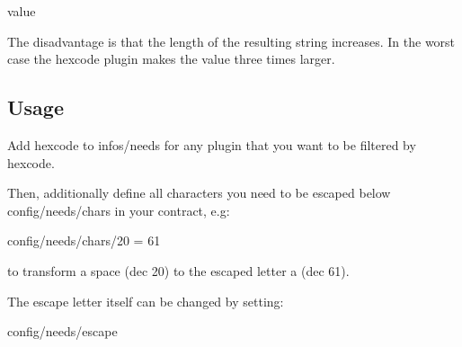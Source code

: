 \begin{DoxyCode}
value%
\end{DoxyCode}


The disadvantage is that the length of the resulting string increases. In the worst case the hexcode plugin makes the value three times larger.

\subsection*{Usage}

Add {\ttfamily hexcode} to {\ttfamily infos/needs} for any plugin that you want to be filtered by hexcode.

Then, additionally define all characters you need to be escaped below {\ttfamily config/needs/chars} in your contract, e.\+g\+:


\begin{DoxyCode}
config/needs/chars/20 = 61
\end{DoxyCode}


to transform a space (dec 20) to the escaped letter a (dec 61).

The escape letter itself can be changed by setting\+:


\begin{DoxyCode}
config/needs/escape
\end{DoxyCode}
 